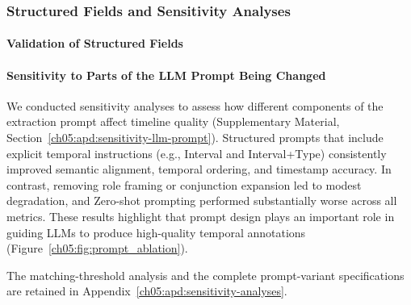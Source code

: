 \subsubsection{Structured Fields and Sensitivity Analyses}
\label{ch05:sec:additional-sensitivity-analyses}

\ChFiveHeadingOnly

\paragraph{Validation of Structured Fields}
\label{ch05:sec:structured-field-validation}



\paragraph{Sensitivity to Parts of the LLM Prompt Being Changed}
We conducted sensitivity analyses to assess how different components of the extraction prompt affect timeline quality (Supplementary Material, Section~\ref{ch05:apd:sensitivity-llm-prompt}).
Structured prompts that include explicit temporal instructions (e.g., Interval and Interval+Type) consistently improved semantic alignment, temporal ordering, and timestamp accuracy.
In contrast, removing role framing or conjunction expansion led to modest degradation, and Zero-shot prompting performed substantially worse across all metrics.
These results highlight that prompt design plays an important role in guiding LLMs to produce high-quality temporal annotations (Figure~\ref{ch05:fig:prompt_ablation}).

The matching-threshold analysis and the complete prompt-variant specifications are retained in Appendix~\ref{ch05:apd:sensitivity-analyses}.
